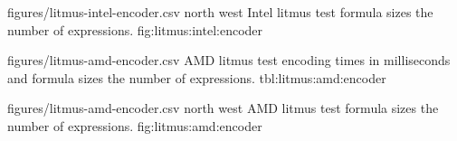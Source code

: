 
\EncoderStatsGraph
  {figures/litmus-intel-encoder.csv}
  {north west}
  {Intel litmus test formula sizes  the number of expressions.}
  {fig:litmus:intel:encoder}

\EncoderStatsTable
  {figures/litmus-amd-encoder.csv}
  {\textnumero}
  {\AMDRowHeader}
  {AMD litmus test encoding times in milliseconds and formula sizes  the number of expressions.}
  {tbl:litmus:amd:encoder}


\EncoderStatsGraph
  {figures/litmus-amd-encoder.csv}
  {north west}
  {AMD litmus test formula sizes  the number of expressions.}
  {fig:litmus:amd:encoder}




\newpage


